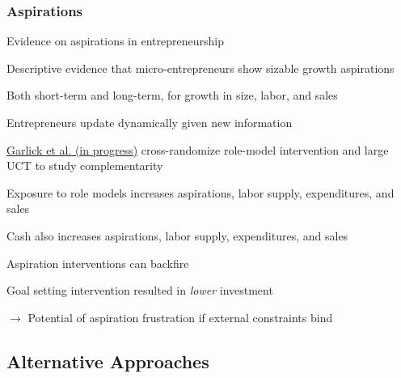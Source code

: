 \documentclass[hideothersubsections, usenames,dvipsnames,11pt]{beamer}
\newenvironment{itemize_2pt}{\itemize\addtolength{\itemsep}{2pt}}{\enditemize}
\begin{document}
\begin{frame}
\frametitle{Aspirations}

Evidence on aspirations in entrepreneurship
\begin{itemize_2pt}
	\item Descriptive evidence that \textcolor{bdf}{micro-entrepreneurs show sizable growth aspirations} \citep{Dalton2018}
	\begin{itemize_2pt}
		\item Both short-term and long-term, for growth in size, labor, and sales
		\item Entrepreneurs update dynamically given new information
	\end{itemize_2pt}
	
	\pause
	
	\item \href{https://www.poverty-action.org/study/impact-cash-transfers-aspirations-and-goal-setting-economic-outcomes-and-well-being}{Garlick et al. (in progress)} cross-randomize role-model intervention and large UCT to study complementarity
	\begin{itemize_2pt}
		\item \textcolor{bdf}{Exposure to role models increases aspirations, labor supply, expenditures, and sales}
		\item Cash also increases aspirations, labor supply, expenditures, and sales
	\end{itemize_2pt}
	
	\pause
	
	\item Aspiration interventions can backfire
	\begin{itemize_2pt}
		\item Goal setting intervention resulted in \textit{lower} investment \citep{McKenzie2021a}
		\item[] $\rightarrow$ Potential of aspiration frustration if external constraints bind 
		\item[] \quad \citep[see also,][]{Galiani2018}
	\end{itemize_2pt}

\end{itemize_2pt}
\end{frame}


\subsection{Alternative Approaches}
\end{document}
